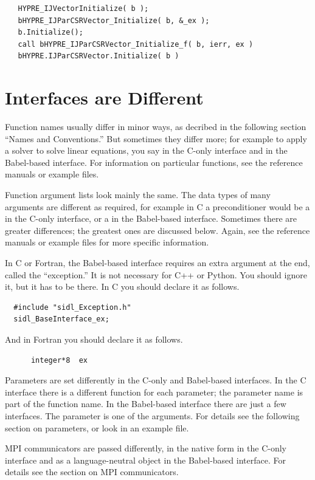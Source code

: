 \begin{verbatim}
   HYPRE_IJVectorInitialize( b );
   bHYPRE_IJParCSRVector_Initialize( b, &_ex );
   b.Initialize();
   call bHYPRE_IJParCSRVector_Initialize_f( b, ierr, ex )
   bHYPRE.IJParCSRVector.Initialize( b )
\end{verbatim}


\section{Interfaces are Different}

Function names usually differ in minor ways, as decribed in the
following section ``Names and Conventions.''  But sometimes they
differ more; for example to apply a solver to solve linear equations,
you say  in the C-only interface and  in the
Babel-based interface.  For information on particular functions, see
the reference manuals or example files.

Function argument lists look mainly the same.  The data types of many
arguments are different as required, for example in C a preconditioner
would be a  in the C-only interface, or a
 in the Babel-based interface.  Sometimes there
are greater differences; the greatest ones are discussed below.
Again, see the reference manuals or example files for more specific
information.

In C or Fortran, the Babel-based interface requires an extra argument
at the end, called the ``exception.''  It is not necessary for C++ or
Python.  You should ignore it, but it has to be there.  In C you
should declare it as follows.
\begin{verbatim}
  #include "sidl_Exception.h"
  sidl_BaseInterface_ex;
\end{verbatim}
And in Fortran you should declare it as follows.
\begin{verbatim}
      integer*8  ex
\end{verbatim}

Parameters are set differently in the C-only and Babel-based
interfaces.  In the C interface there is a different 
function for each parameter; the parameter name is part of the
function name.  In the Babel-based interface there are just a few
 interfaces.  The parameter is one of the
arguments.  For details see the following section on parameters, or
look in an example file.

MPI communicators are passed differently, in the native form in the
C-only interface and as a language-neutral object in the Babel-based
interface.  For details see the section on MPI communicators.


